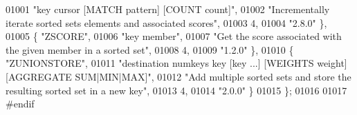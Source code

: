 \begin{DoxyCode}
01001     \textcolor{stringliteral}{"key cursor [MATCH pattern] [COUNT count]"},
01002     \textcolor{stringliteral}{"Incrementally iterate sorted sets elements and associated scores"},
01003     4,
01004     \textcolor{stringliteral}{"2.8.0"} \},
01005     \{ \textcolor{stringliteral}{"ZSCORE"},
01006     \textcolor{stringliteral}{"key member"},
01007     \textcolor{stringliteral}{"Get the score associated with the given member in a sorted set"},
01008     4,
01009     \textcolor{stringliteral}{"1.2.0"} \},
01010     \{ \textcolor{stringliteral}{"ZUNIONSTORE"},
01011     \textcolor{stringliteral}{"destination numkeys key [key ...] [WEIGHTS weight] [AGGREGATE SUM|MIN|MAX]"},
01012     \textcolor{stringliteral}{"Add multiple sorted sets and store the resulting sorted set in a new key"},
01013     4,
01014     \textcolor{stringliteral}{"2.0.0"} \}
01015 \};
01016 
01017 \textcolor{preprocessor}{#}\textcolor{preprocessor}{endif}
\end{DoxyCode}
